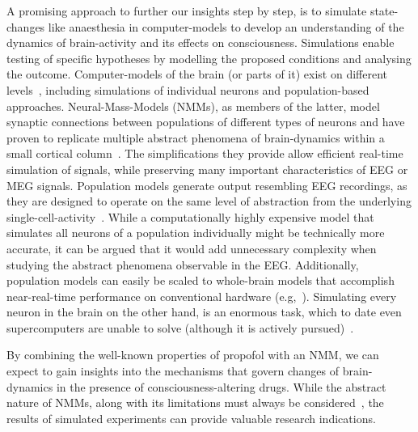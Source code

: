 A promising approach to further our insights step by step, is to simulate state-changes
like anaesthesia in computer-models to develop an understanding of the dynamics of brain-activity and its
effects on consciousness. %
Simulations enable testing of specific hypotheses by modelling the proposed conditions and analysing the outcome.
Computer-models of the brain (or parts of it) exist on different levels~\cite{panahi_generative_2021},
including simulations of individual neurons and population-based approaches.
Neural-Mass-Models (NMMs), as members of the latter, model synaptic connections between populations of different types
of neurons and have proven to replicate multiple abstract phenomena of brain-dynamics
within a small cortical column~\cite{bojak_neural_2014, knösche_jansen-rit_2014}.
The simplifications they provide allow efficient real-time simulation of signals,
while preserving many important characteristics of EEG or MEG signals.
Population models generate output resembling EEG recordings,
as they are designed to operate on the same level of abstraction
from the underlying single-cell-activity~\cite{deco_dynamic_2008}.
While a computationally highly expensive model that simulates all neurons of a population individually might
be technically more accurate,
it can be argued that it would add unnecessary complexity
when studying the abstract phenomena observable in the EEG.
Additionally, population models can easily be scaled to whole-brain models
that accomplish near-real-time performance on conventional hardware (e.g,~\cite{bensaid_coalia_2019}).
Simulating every neuron in the brain on the other hand, is an enormous task,
which to date even supercomputers are unable to solve (although it is actively pursued)~\cite{jordan_extremely_2018}.

By combining the well-known properties of propofol with an NMM, we can expect to gain insights into the mechanisms that
govern changes of brain-dynamics in the presence of consciousness-altering drugs.
While the abstract nature of NMMs, along with its limitations must always be
considered~\cite{deschle_validity_2021},
the results of simulated experiments can provide valuable research indications.
